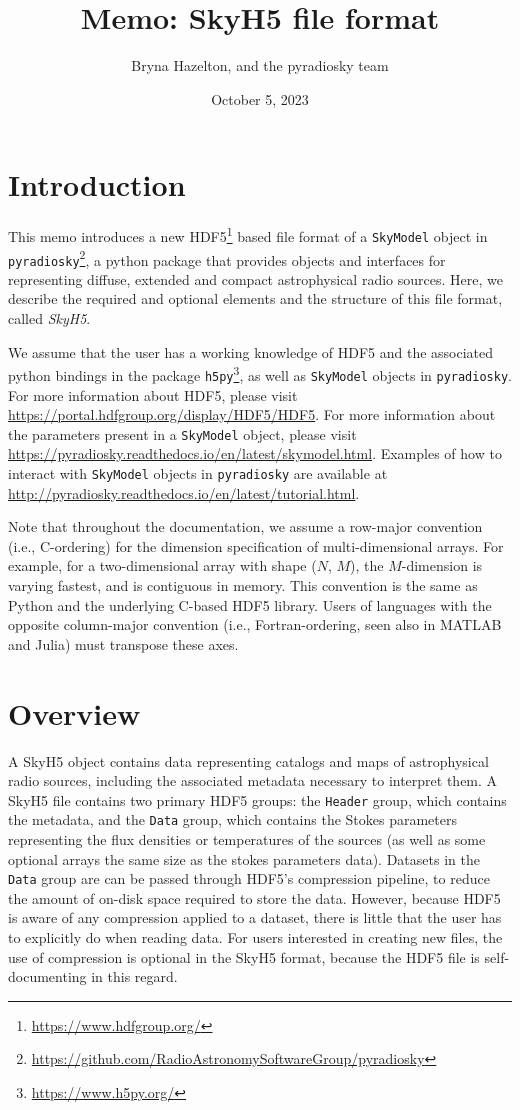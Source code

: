 \documentclass[11pt, oneside]{article}
\title{Memo: SkyH5 file format}
\author{Bryna Hazelton, and the pyradiosky team}
\date{October 5, 2023}
\begin{document}
\maketitle
\tableofcontents
\section{Introduction}
\label{sec:intro}

This memo introduces a new HDF5\footnote{\url{https://www.hdfgroup.org/}} based
file format of a \texttt{SkyModel} object in \texttt{pyradiosky}\footnote{\url{https://github.com/RadioAstronomySoftwareGroup/pyradiosky}},
a python package that provides objects and interfaces for representing diffuse, extended and compact astrophysical radio sources.
Here, we describe the required and optional elements and the structure of this file format, called \textit{SkyH5}.

We assume that the user has a working knowledge of HDF5 and the associated
python bindings in the package \texttt{h5py}\footnote{\url{https://www.h5py.org/}}, as
well as \texttt{SkyModel} objects in \texttt{pyradiosky}. For more information about HDF5, please
visit \url{https://portal.hdfgroup.org/display/HDF5/HDF5}. For more information
about the parameters present in a \texttt{SkyModel} object, please visit
\url{https://pyradiosky.readthedocs.io/en/latest/skymodel.html}.
Examples of how to interact with \texttt{SkyModel} objects in \texttt{pyradiosky} are available at
\url{http://pyradiosky.readthedocs.io/en/latest/tutorial.html}.

Note that throughout the documentation, we assume a row-major convention (i.e.,
C-ordering) for the dimension specification of multi-dimensional arrays. For
example, for a two-dimensional array with shape ($N$, $M$), the $M$-dimension is
varying fastest, and is contiguous in memory. This convention is the same as
Python and the underlying C-based HDF5 library. Users of languages with the
opposite column-major convention (i.e., Fortran-ordering, seen also in MATLAB
and Julia) must transpose these axes.

\section{Overview}
\label{sec:overview}
A SkyH5 object contains data representing catalogs and maps of
astrophysical radio sources, including the associated metadata necessary to interpret them.
A SkyH5 file contains two primary HDF5 groups: the \texttt{Header} group, which contains the metadata, and
the \texttt{Data} group, which contains the Stokes parameters representing the
flux densities or temperatures of the sources (as well as some optional arrays the same size as the stokes parameters data).
Datasets in the \texttt{Data} group
are can be passed through HDF5's compression
pipeline, to reduce the amount of on-disk space required to store the data.
However, because HDF5 is aware of any compression applied to a dataset, there is
little that the user has to explicitly do when reading data. For users
interested in creating new files, the use of compression is optional in the
SkyH5 format, because the HDF5 file is self-documenting in this regard.
\end{document}
